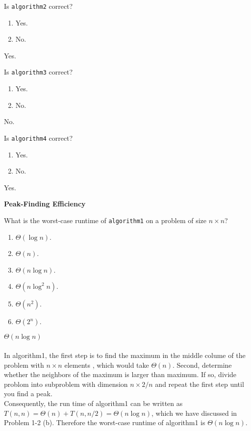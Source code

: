 \documentclass[12pt,twoside]{article}
\begin{document}
\begin{problems}
\begin{problemparts}
\problempart {} Is \texttt{algorithm2} correct?
\begin{enumerate}
\item Yes.
\item No.
\end{enumerate}

\ifsolution \solution{}
{\color{blue}Yes.}
\fi

\problempart {} Is \texttt{algorithm3} correct?
\begin{enumerate}
\item Yes.
\item No.
\end{enumerate}

\ifsolution \solution{}
{\color{blue}No.}
\fi

\problempart {} Is \texttt{algorithm4} correct?
\begin{enumerate}
\item Yes.
\item No.
\end{enumerate}

\ifsolution \solution{}
{\color{blue}Yes.}
\fi

\end{problemparts}

\problem {} \textbf{Peak-Finding Efficiency}

\begin{problemparts}

\problempart {} What is the worst-case runtime of \texttt{algorithm1} on a problem of size $n \times n$?
\begin{enumerate}
\item $\Theta(\log n)$.
\item $\Theta(n)$.
\item $\Theta(n \log n)$.
\item $\Theta(n \log^2 n)$.
\item $\Theta(n^2)$.
\item $\Theta(2^n)$.
\end{enumerate}

\ifsolution \solution{}
{\color{blue}$\Theta(n \log n)$
\\
\\
In algorithm1, the first step is to find the maximum in the middle colume of the problem with $n\times n$ elements , 
which would take $\Theta(n)$. Second, determine whether the neighbors of the maximum is larger than maximum. If so, 
divide problom into subproblem with dimension $n\times2/n$ and repeat the first step until you find a peak.
\\
Consequently, the run time of algorithm1 can be written as $T(n, n) = \Theta(n) + T(n,n/2) = \Theta(n\log n)$, 
which we have discussed in Problem 1-2 (b). Therefore the worst-case runtime of algorithm1 is $\Theta(n\log n)$.}
\\
\fi


\end{problemparts}
\end{problems}
\end{document}
